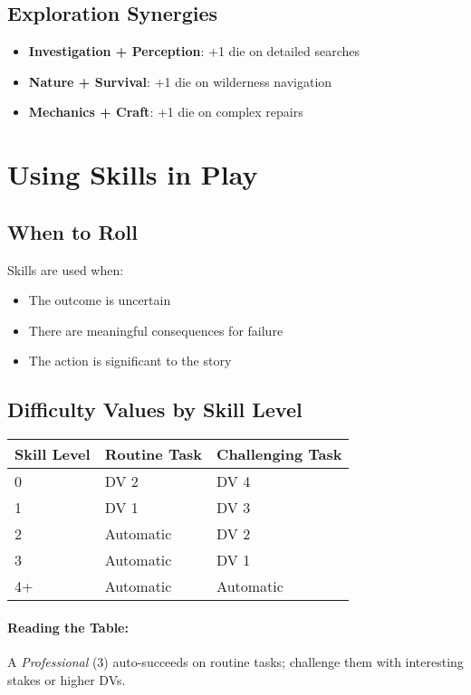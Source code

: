 \begin{multicols}{2}
\subsection*{Exploration Synergies}
\begin{itemize}
\item \textbf{Investigation + Perception}: +1 die on detailed searches
\item \textbf{Nature + Survival}: +1 die on wilderness navigation
\item \textbf{Mechanics + Craft}: +1 die on complex repairs
\end{itemize}

\section{Using Skills in Play}

\subsection*{When to Roll}
Skills are used when:
\begin{itemize}
\item The outcome is uncertain
\item There are meaningful consequences for failure
\item The action is significant to the story
\end{itemize}

\subsection*{Difficulty Values by Skill Level}
\begin{center}
\small
\begin{tabular}{lll}
\toprule
\textbf{Skill Level} & \textbf{Routine Task} & \textbf{Challenging Task} \\
\midrule
0 & DV 2 & DV 4 \\
1 & DV 1 & DV 3 \\
2 & Automatic & DV 2 \\
3 & Automatic & DV 1 \\
4+ & Automatic & Automatic \\
\bottomrule
\end{tabular}
\end{center}

\paragraph{Reading the Table:}
A \emph{Professional} (3) auto-succeeds on routine tasks; challenge them with interesting stakes or higher DVs.


\end{multicols}
